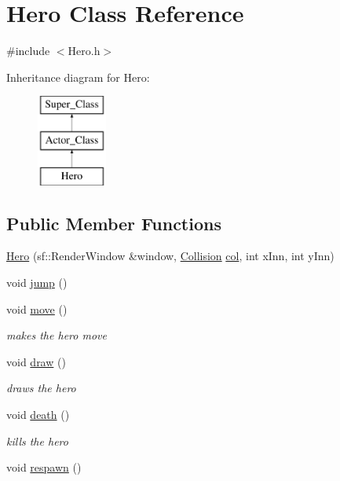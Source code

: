 \hypertarget{class_hero}{}\section{Hero Class Reference}
\label{class_hero}


{\ttfamily \#include $<$Hero.\+h$>$}

Inheritance diagram for Hero\+:\begin{figure}[H]
\begin{center}
\leavevmode
\includegraphics[height=3.000000cm]{class_hero}
\end{center}
\end{figure}
\subsection*{Public Member Functions}
\begin{DoxyCompactItemize}
\item 
\hyperlink{class_hero_aa8d54981ec6db2a2e0311f1dd213691e}{Hero} (sf\+::\+Render\+Window \&window, \hyperlink{class_collision}{Collision} \hyperlink{class_hero_aea83769f887a67e6d88679a45952a61a}{col}, int x\+Inn, int y\+Inn)
\item 
void \hyperlink{class_hero_a1bee38d9164cf1ecda512cc24e81b171}{jump} ()
\item 
void \hyperlink{class_hero_a24e136aeddd49d1a7d0c068079fbab7e}{move} ()
\begin{DoxyCompactList}\small\item\em makes the hero move \end{DoxyCompactList}\item 
void \hyperlink{class_hero_abc9f2dece1e3757ba2b315a332f995c2}{draw} ()
\begin{DoxyCompactList}\small\item\em draws the hero \end{DoxyCompactList}\item 
void \hyperlink{class_hero_a62d93b951b0b769c75ddbdf1615660a0}{death} ()
\begin{DoxyCompactList}\small\item\em kills the hero \end{DoxyCompactList}\item 
void \hyperlink{class_hero_a585f9c068f73d937d6a6f90c9ccad41c}{respawn} ()
\end{DoxyCompactItemize}
